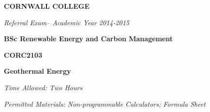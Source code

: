 \documentclass[a4paper,12pt,fleqn]{article}
\newcommand{\institution}{CORNWALL COLLEGE}
\newcommand{\titlehd}{BSc Renewable Energy and Carbon Management}
\newcommand{\examtype}{Referral Exam}
\newcommand{\examdate}{Academic Year 2014-2015}
\newcommand{\examcode}{CORC2103}
\newcommand{\examtitle}{Geothermal Energy}
\newcommand{\readtime}{15 Minutes}
\newcommand{\writetime}{Two Hours}
\newcommand{\materials}{Non-programmable Calculators; Formula Sheet}
\begin{document}

\begin{center}
\large\textbf{\institution}
\end{center}
\vspace{1cm}

\begin{center}
\textit{ \examtype -- \examdate}
\end{center}
\vspace{1cm}

\begin{center}
\large\textbf{\titlehd}
\end{center}

\begin{center}
\large\textbf{\examcode}
\end{center}
\begin{center}
\large\textbf{\examtitle}
\end{center}
\vspace{4cm}
\vspace{4cm}

\begin{center}
\end{center}
\begin{center}
\textit{Time Allowed:  \writetime}
\end{center}
\begin{center}
\textit{Permitted Materials: \materials}
\end{center}
\end{document}
